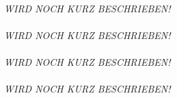 \paragraph{\fenkart}
\textit{WIRD NOCH KURZ BESCHRIEBEN!}

\paragraph{\mangeng}
\textit{WIRD NOCH KURZ BESCHRIEBEN!}

\paragraph{\pezze}
\textit{WIRD NOCH KURZ BESCHRIEBEN!}

\paragraph{\schneider}
\textit{WIRD NOCH KURZ BESCHRIEBEN!}
